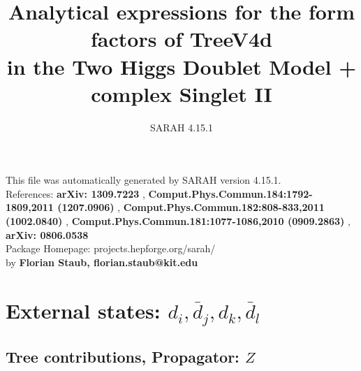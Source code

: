 \documentclass[A4,landscape]{article}
\begin{document}
\title{Analytical expressions for the form factors of TreeV4d\\ in the Two Higgs Doublet Model + complex Singlet II } 
 \author{SARAH 4.15.1} 
 \maketitle 
 \vspace{10cm} 
This file was automatically generated by SARAH version 4.15.1.  \\ 
References: {\bf arXiv: 1309.7223 }, {\bf Comput.Phys.Commun.184:1792-1809,2011 (1207.0906) }, {\bf Comput.Phys.Commun.182:808-833,2011 (1002.0840) }, {\bf Comput.Phys.Commun.181:1077-1086,2010 (0909.2863) }, {\bf arXiv: 0806.0538 } \\ 
Package Homepage: projects.hepforge.org/sarah/ \\ 
by {\bf Florian Staub, florian.staub@kit.edu} 
 \pagebreak 
 \tableofcontents 
 \pagebreak 
\section{External states: ${d_{{i}}, \bar{d}_{{j}}, d_{{k}}, \bar{d}_{{l}}}$} 
\subsection{Tree contributions, Propagator: $Z$} 
\end{document}
